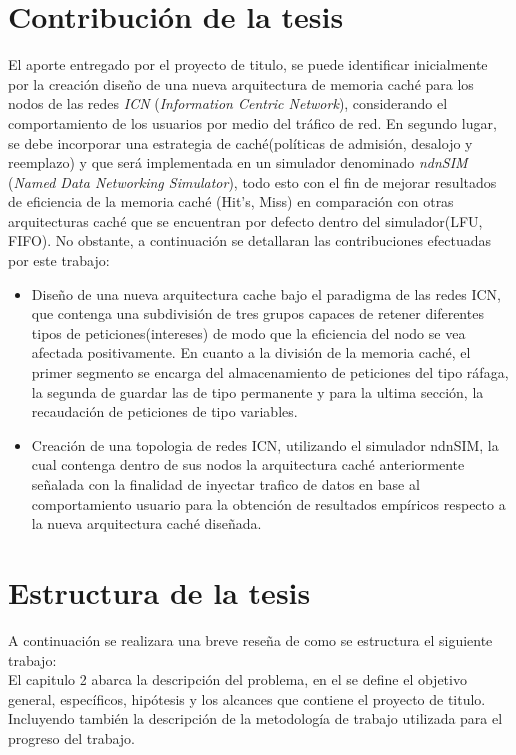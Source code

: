 \documentclass[12pt]{ociamthesis}  %
\begin{document}
\section{Contribución de la tesis}
El aporte entregado por el proyecto de titulo, se puede identificar inicialmente por la creación diseño de una nueva arquitectura de memoria caché para los nodos de las redes \textit{ICN} (\textit{Information Centric Network}), considerando el comportamiento de los usuarios por medio del tráfico de red. En segundo lugar, se debe incorporar una estrategia de caché(políticas de admisión, desalojo y reemplazo) y que será implementada en un simulador denominado \textit{ndnSIM} (\textit{Named Data Networking Simulator}), todo esto con el fin de mejorar resultados de eficiencia de la memoria caché (Hit's, Miss) en comparación con otras arquitecturas caché que se encuentran por defecto dentro del simulador(LFU, FIFO). No obstante, a continuación se detallaran las contribuciones efectuadas por este trabajo:\\
\begin{itemize}
	\item Diseño de una nueva arquitectura cache bajo el paradigma de las redes ICN, que contenga una subdivisión de tres grupos capaces de retener diferentes tipos de peticiones(intereses) de modo que la eficiencia del nodo se vea afectada positivamente. En cuanto a la división de la memoria caché, el primer segmento se encarga del almacenamiento de peticiones del tipo ráfaga, la segunda de guardar las de tipo permanente y para la ultima sección, la recaudación de peticiones de tipo variables.\\
	\item Creación de una topologia de redes ICN, utilizando el simulador ndnSIM, la cual contenga dentro de sus nodos la arquitectura caché anteriormente señalada con la finalidad de inyectar trafico de datos en base al comportamiento usuario para la obtención de resultados empíricos respecto a la nueva arquitectura caché diseñada.\\
\end{itemize}


\section{Estructura de la tesis}
A continuación se realizara una breve reseña de como se estructura el siguiente trabajo:\\

El capitulo 2 abarca la descripción del problema, en el se define el objetivo general, específicos, hipótesis y los alcances que contiene el proyecto de titulo. Incluyendo también la descripción de la metodología de trabajo utilizada para el progreso del trabajo.\\
\end{document}

